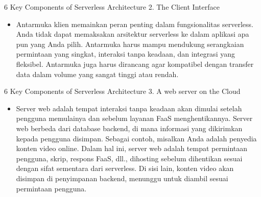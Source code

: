 \documentclass{beamer}
\begin{document}
    \begin{frame}{6 Key Components of Serverless Architecture}
    	2. The Client Interface
        \begin{itemize}
            \item 
            Antarmuka klien memainkan peran penting dalam fungsionalitas serverless. Anda tidak dapat memaksakan arsitektur serverless ke dalam aplikasi apa pun yang Anda pilih. 
            Antarmuka harus mampu mendukung serangkaian permintaan yang singkat, interaksi tanpa keadaan, dan integrasi yang fleksibel. 
            Antarmuka juga harus dirancang agar kompatibel dengan transfer data dalam volume yang sangat tinggi atau rendah.
        \end{itemize}
    \end{frame}

    \begin{frame}{6 Key Components of Serverless Architecture}
    	3. A web server on the Cloud
        \begin{itemize}
            \item Server web adalah tempat interaksi tanpa keadaan akan dimulai setelah pengguna memulainya dan sebelum layanan FaaS menghentikannya. 
            Server web berbeda dari database backend, di mana informasi yang dikirimkan kepada pengguna disimpan. Sebagai contoh, misalkan Anda adalah penyedia konten video online. 
            Dalam hal ini, server web adalah tempat permintaan pengguna, skrip, respons FaaS, dll., dihosting sebelum dihentikan sesuai dengan sifat sementara dari serverless.
            Di sisi lain, konten video akan disimpan di penyimpanan backend, menunggu untuk diambil sesuai permintaan pengguna.
        \end{itemize}
    \end{frame}
\end{document}
